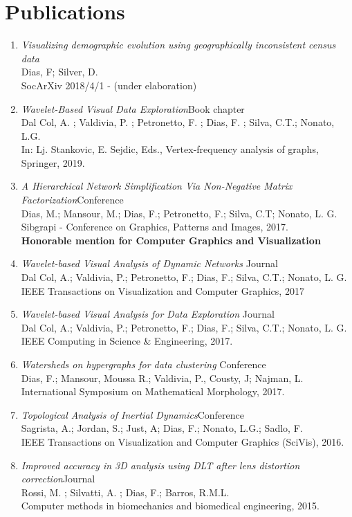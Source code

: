 \documentclass[12pt]{article}
\newcommand{\pub}[4]{
  {\emph{#1}\hfill{\small#2}\\
    #3\\
    #4}}
\begin{document}
\section*{Publications} 


\begin{enumerate}
  \item{
    \pub
        {Visualizing demographic evolution using geographically inconsistent census data}{}
        {Dias, F; Silver, D.}
        {SocArXiv 2018/4/1 - (under elaboration)}
  }
  \item{
    \pub
        {Wavelet-Based Visual Data Exploration}{Book chapter}
        {Dal Col, A. ; Valdivia, P. ; Petronetto, F. ; Dias, F. ; Silva, C.T.; Nonato,  L.G. }
        {In: Lj. Stankovic, E. Sejdic, Eds., Vertex-frequency analysis of graphs, Springer, 2019.}
  }
  \item{
    \pub
        {A Hierarchical Network Simplification Via Non-Negative Matrix Factorization}{Conference}
        {Dias, M.; Mansour, M.; Dias, F.; Petronetto, F.; Silva, C.T; Nonato,  L. G. }  
        {Sibgrapi - Conference on Graphics, Patterns and Images, 2017.
        \\\textbf{Honorable mention for Computer Graphics and Visualization}}
  }  
\item{
  \pub
      {Wavelet-based Visual Analysis of Dynamic Networks }{  Journal}
      {Dal Col, A.; Valdivia, P.; Petronetto, F.; Dias, F.; Silva, C.T.; Nonato, L. G.}  
      {IEEE Transactions on Visualization and Computer Graphics, 2017}
}
\item{
  \pub
      {Wavelet-based Visual Analysis for Data Exploration }{ Journal}
      {Dal Col, A.; Valdivia, P.; Petronetto, F.; Dias, F.; Silva, C.T.; Nonato, L. G.}  
      {IEEE Computing in Science \& Engineering, 2017.}
}
\item{
  \pub
      {Watersheds on hypergraphs for data clustering}{ Conference}
      {Dias, F.; Mansour, Moussa R.; Valdivia, P., Cousty, J; Najman, L.}  
      {International Symposium on Mathematical Morphology, 2017.}
}
\item{
  \pub
      {Topological Analysis of Inertial Dynamics}{Conference}
      {Sagrista, A.; Jordan, S.; Just, A; Dias, F.; Nonato, L.G.; Sadlo, F.}
      {IEEE Transactions on Visualization and Computer Graphics (SciVis), 2016.}
}
\item{
  \pub
      {Improved accuracy in 3D analysis using DLT after lens distortion correction}{Journal}
      {Rossi, M. ;  Silvatti, A. ; Dias, F.;   Barros, R.M.L.}
      {Computer methods in biomechanics and biomedical engineering, 2015.}
}
  

\end{enumerate}
\end{document}
